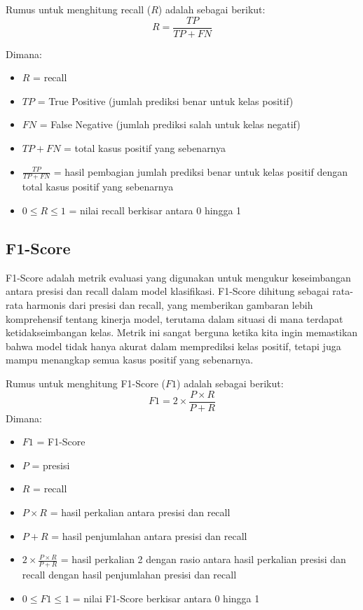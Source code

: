 Rumus untuk menghitung recall ($R$) adalah sebagai berikut:
\begin{equation}
    R = \frac{TP}{TP + FN}
\end{equation}

Dimana:
\begin{itemize}
    \item $R$ = recall
    \item $TP$ = True Positive (jumlah prediksi benar untuk kelas positif)
    \item $FN$ = False Negative (jumlah prediksi salah untuk kelas negatif)
    \item $TP + FN$ = total kasus positif yang sebenarnya
    \item $\frac{TP}{TP + FN}$ = hasil pembagian jumlah prediksi benar untuk kelas positif dengan total kasus positif yang sebenarnya
    \item $0 \leq R \leq 1$ = nilai recall berkisar antara 0 hingga 1
\end{itemize}

\subsection{F1-Score}
F1-Score adalah metrik evaluasi yang digunakan untuk mengukur keseimbangan antara presisi dan recall dalam model klasifikasi. F1-Score dihitung sebagai rata-rata harmonis dari presisi dan recall, yang memberikan gambaran lebih komprehensif tentang kinerja model, terutama dalam situasi di mana terdapat ketidakseimbangan kelas. Metrik ini sangat berguna ketika kita ingin memastikan bahwa model tidak hanya akurat dalam memprediksi kelas positif, tetapi juga mampu menangkap semua kasus positif yang sebenarnya. \parencite{jain2016feature}

Rumus untuk menghitung F1-Score ($F1$) adalah sebagai berikut:
\begin{equation}
    F1 = 2 \times \frac{P \times R}{P + R}
\end{equation}
Dimana:
\begin{itemize}
    \item $F1$ = F1-Score
    \item $P$ = presisi
    \item $R$ = recall
    \item $P \times R$ = hasil perkalian antara presisi dan recall
    \item $P + R$ = hasil penjumlahan antara presisi dan recall
    \item $2 \times \frac{P \times R}{P + R}$ = hasil perkalian 2 dengan rasio antara hasil perkalian presisi dan recall dengan hasil penjumlahan presisi dan recall
    \item $0 \leq F1 \leq 1$ = nilai F1-Score berkisar antara 0 hingga 1
\end{itemize}

